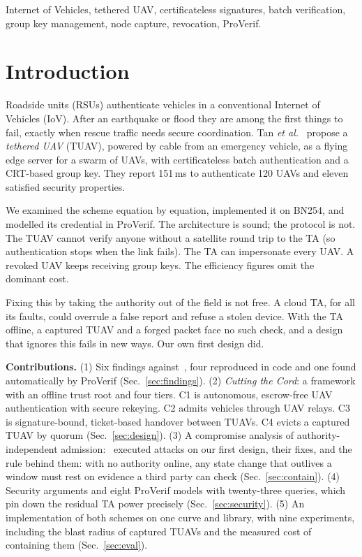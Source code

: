 \documentclass[conference]{IEEEtran}
\begin{document}
\begin{IEEEkeywords}
Internet of Vehicles, tethered UAV, certificateless signatures, batch verification, group key management, node capture, revocation, ProVerif.
\end{IEEEkeywords}

\section{Introduction}
Roadside units (RSUs) authenticate vehicles in a conventional Internet of Vehicles (IoV). After an earthquake or flood they are among the first things to fail,
exactly when rescue traffic needs secure coordination. Tan \textit{et al.}~\cite{base} propose a \emph{tethered UAV} (TUAV), powered by cable from an
emergency vehicle, as a flying edge server for a swarm of UAVs, with certificateless batch authentication and a CRT-based group key. They report 151\,ms to
authenticate 120 UAVs and eleven satisfied security properties.

We examined the scheme equation by equation, implemented it on BN254, and modelled its credential in ProVerif. The architecture is sound; the protocol is not.
The TUAV cannot verify anyone without a satellite round trip to the TA (so authentication stops when the link fails). The TA can impersonate every UAV. A
revoked UAV keeps receiving group keys. The efficiency figures omit the dominant cost.

Fixing this by taking the authority out of the field is not free. A cloud TA, for all its faults, could overrule a false report and refuse a stolen device. With the TA
offline, a captured TUAV and a forged packet face no such check, and a design that ignores this fails in new ways. Our own first design did.

\textbf{Contributions.} (1) Six findings against~\cite{base}, four reproduced in code and one found automatically by ProVerif (Sec.~\ref{sec:findings}).
(2) \emph{Cutting the Cord}: a framework with an offline trust root and four tiers. C1 is autonomous, escrow-free UAV authentication with secure rekeying. C2
admits vehicles through UAV relays. C3 is signature-bound, ticket-based handover between TUAVs. C4 evicts a captured TUAV by quorum (Sec.~\ref{sec:design}).
(3) A compromise analysis of authority-independent admission: \EAttacksVOne\ executed attacks on our first design, their fixes, and the rule behind them: with no
authority online, any state change that outlives a window must rest on evidence a third party can check (Sec.~\ref{sec:contain}). (4) Security arguments and eight
ProVerif models with twenty-three queries, which pin down the residual TA power precisely (Sec.~\ref{sec:security}). (5) An implementation of both schemes on one curve and
library, with nine experiments, including the blast radius of captured TUAVs and the measured cost of containing them (Sec.~\ref{sec:eval}).
\end{document}
